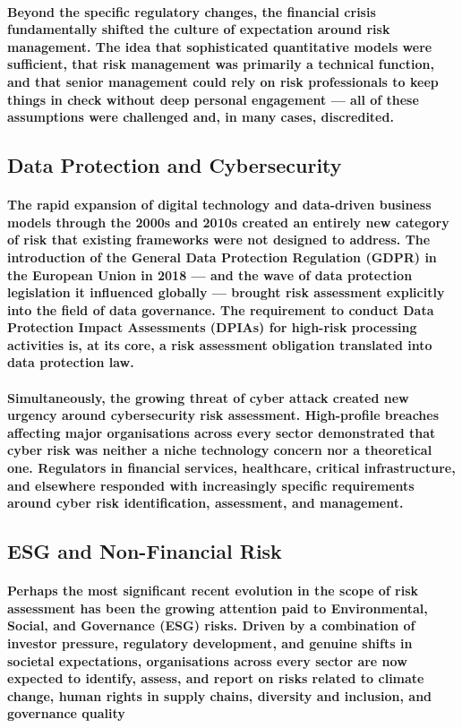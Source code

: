 \paragraph{Beyond the specific regulatory changes, the financial crisis fundamentally shifted the culture of expectation around risk management. The idea that sophisticated quantitative models were sufficient, that risk management was primarily a technical function, and that senior management could rely on risk professionals to keep things in check without deep personal engagement — all of these assumptions were challenged and, in many cases, discredited.}

\subsection{Data Protection and Cybersecurity}
\paragraph{The rapid expansion of digital technology and data-driven business models through the 2000s and 2010s created an entirely new category of risk that existing frameworks were not designed to address. The introduction of the \textbf{General Data Protection Regulation (GDPR)} in the European Union in 2018 — and the wave of data protection legislation it influenced globally — brought risk assessment explicitly into the field of data governance. The requirement to conduct \textbf{Data Protection Impact Assessments (DPIAs)} for high-risk processing activities is, at its core, a risk assessment obligation translated into data protection law.}
\paragraph{Simultaneously, the growing threat of cyber attack created new urgency around cybersecurity risk assessment. High-profile breaches affecting major organisations across every sector demonstrated that cyber risk was neither a niche technology concern nor a theoretical one. Regulators in financial services, healthcare, critical infrastructure, and elsewhere responded with increasingly specific requirements around cyber risk identification, assessment, and management.}

\subsection{ESG and Non-Financial Risk}
\paragraph{Perhaps the most significant recent evolution in the scope of risk assessment has been the growing attention paid to \textbf{Environmental, Social, and Governance (ESG)} risks. Driven by a combination of investor pressure, regulatory development, and genuine shifts in societal expectations, organisations across every sector are now expected to identify, assess, and report on risks related to climate change, human rights in supply chains, diversity and inclusion, and governance quality}
